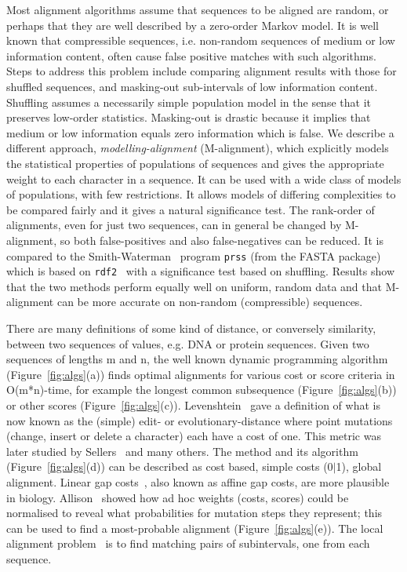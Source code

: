 \documentclass[letterpaper,11pt,oneside]{article}
\begin{document}
Most alignment algorithms assume that sequences to be aligned are random,
or perhaps that they are well described by a zero-order Markov model.
It is well known that compressible sequences,
i.e. non-random sequences of medium or low information content,
often cause false positive matches with such algorithms.
Steps to address this problem include
comparing alignment results with those for shuffled sequences, and
masking-out sub-intervals of low information content.
Shuffling assumes a necessarily simple population model in the sense that it preserves low-order statistics.
Masking-out is drastic because it implies that
medium or low information equals zero information which is false.
We describe a different approach, {\em modelling-alignment} (M-alignment), which explicitly models
the statistical properties of populations of sequences and
gives the appropriate weight to each character in a sequence.
It can be used with a wide class of models of populations,
with few restrictions.
It allows models of differing complexities to be compared fairly and
it gives a natural significance test.
The rank-order of alignments, even for just two sequences, can in general
be changed by M-alignment, so both false-positives and also false-negatives can be reduced.
It is compared to the Smith-Waterman~\cite{smith81} program \verb!prss! (from the FASTA
package) which is based on \verb!rdf2!~\cite{pearson88}
with a significance test based on shuffling.
Results show that the two methods perform equally well on uniform, random data and
that M-alignment can be more accurate on non-random (compressible) sequences.

There are many definitions of some kind
of distance, or conversely similarity, between two
sequences of values, e.g. DNA or protein sequences.
Given two sequences of lengths m and n,
the well known dynamic programming algorithm (Figure~\ref{fig:algs}(a)) finds
optimal alignments for various cost or score criteria in O(m*n)-time,
for example the longest common subsequence (Figure~\ref{fig:algs}(b)) or
other scores (Figure~\ref{fig:algs}(c)).
Levenshtein~\cite{levenshtein66} gave a definition of what is now known as the
(simple) edit- or evolutionary-distance where point mutations
(change, insert or delete a character) each have a cost of one.
This metric was later studied by Sellers~\cite{sellers74} and many others.
The method and its algorithm (Figure~\ref{fig:algs}(d)) can be described as cost based, simple costs (0$|$1), global alignment.
Linear gap costs~\cite{gotoh82}, also known as affine gap costs, are more plausible in biology.
Allison~\cite{allison93a} showed how ad hoc weights (costs, scores) could be normalised
to reveal what probabilities for mutation steps they represent;
this can be used to find a most-probable alignment (Figure~\ref{fig:algs}(e)).
The local alignment problem~\cite{sellers80} is to find
matching pairs of subintervals, one from each sequence.
\end{document}
